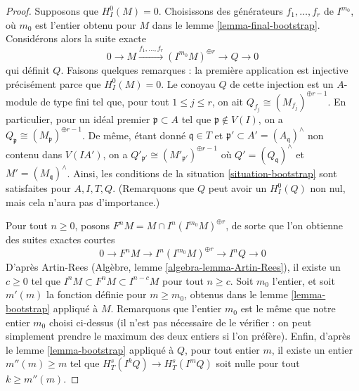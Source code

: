 \begin{proof}
\medskip\noindent
Supposons que $H^0_I(M) = 0$. Choisissons des générateurs
$f_1, \ldots, f_r$ de $I^{m_0}$, où $m_0$ est l'entier
obtenu pour $M$ dans le lemme \ref{lemma-final-bootstrap}.
Considérons alors la suite exacte
$$
0 \to M \xrightarrow{f_1, \ldots, f_r}
(I^{m_0}M)^{\oplus r} \to Q \to 0
$$
qui définit $Q$. Faisons quelques remarques : la première application est injective
précisément parce que $H^0_I(M) = 0$. Le conoyau $Q$ de cette injection
est un $A$-module de type fini tel que, pour tout $1 \leq j \leq r$,
on ait $Q_{f_j} \cong (M_{f_j})^{\oplus r - 1}$.
En particulier, pour un idéal premier $\mathfrak p \subset A$
tel que $\mathfrak p \not \in V(I)$, on a
$Q_\mathfrak p \cong (M_\mathfrak p)^{\oplus r - 1}$.
De même, étant donné $\mathfrak q \in T$ et
$\mathfrak p' \subset A' = (A_\mathfrak q)^\wedge$
non contenu dans $V(IA')$, on a
$Q'_{\mathfrak p'} \cong (M'_{\mathfrak p'})^{\oplus r - 1}$
où $Q' = (Q_\mathfrak q)^\wedge$ et $M' = (M_\mathfrak q)^\wedge$.
Ainsi, les conditions de la situation \ref{situation-bootstrap}
sont satisfaites pour $A, I, T, Q$. (Remarquons que $Q$ peut avoir
un $H^0_I(Q)$ non nul, mais cela n'aura pas d'importance.)

\medskip\noindent
Pour tout $n \geq 0$, posons $F^nM = M \cap I^n(I^{m_0}M)^{\oplus r}$,
de sorte que l'on obtienne des suites exactes courtes
$$
0 \to F^nM \to I^n(I^{m_0}M)^{\oplus r} \to I^nQ \to 0
$$
D'après Artin-Rees (Algèbre, lemme \ref{algebra-lemma-Artin-Rees}),
il existe un $c \geq 0$ tel que
$I^n M \subset F^nM \subset I^{n - c}M$ pour tout $n \geq c$.
Soit $m_0$ l'entier, et soit $m'(m)$
la fonction définie pour $m \geq m_0$,
obtenus dans le lemme \ref{lemma-bootstrap}
appliqué à $M$. Remarquons que l'entier $m_0$
est le même que notre entier $m_0$ choisi ci-dessus (il n'est pas nécessaire de
le vérifier : on peut simplement prendre le maximum des deux entiers si
l'on préfère). Enfin, d'après le lemme \ref{lemma-bootstrap}
appliqué à $Q$, pour tout entier $m$, il existe un entier
$m''(m) \geq m$ tel que $H^s_T(I^kQ) \to H^s_T(I^mQ)$
soit nulle pour tout $k \geq m''(m)$.


\end{proof}
